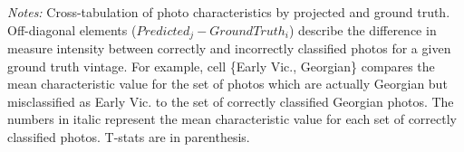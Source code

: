 \documentclass[]{article}
\begin{document}
\begin{table}[!htb]
\begin{tabular}{lrrrrrrr}
\end{tabular} 
 \begin{minipage}{\textwidth} 
\footnotesize 
\vspace{0.25cm}
\emph{Notes:} Cross-tabulation of photo characteristics by projected and ground truth. Off-diagonal elements ($Predicted_{j}-Ground Truth_{i}$) describe the difference in measure intensity between correctly and incorrectly classified photos for a given ground truth vintage. For example, cell \{Early Vic., Georgian\} compares the mean characteristic value for the set of photos which are actually Georgian but misclassified as Early Vic. to the set of correctly classified Georgian photos. The numbers in italic represent the mean characteristic value for each set of correctly classified photos. T-stats are in parenthesis.
\end{minipage} 
\endgroup 
\end{table}
\end{document}
